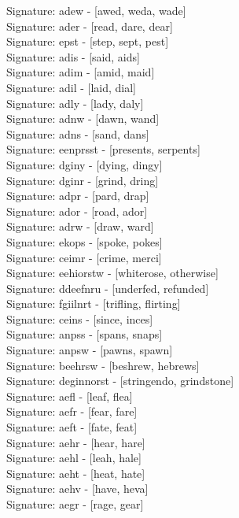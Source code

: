 Signature: {adew} - [awed, weda, wade] \\
Signature: {ader} - [read, dare, dear] \\
Signature: {epst} - [step, sept, pest] \\
Signature: {adis} - [said, aids] \\
Signature: {adim} - [amid, maid] \\
Signature: {adil} - [laid, dial] \\
Signature: {adly} - [lady, daly] \\
Signature: {adnw} - [dawn, wand] \\
Signature: {adns} - [sand, dans] \\
Signature: {eenprsst} - [presents, serpents] \\
Signature: {dginy} - [dying, dingy] \\
Signature: {dginr} - [grind, dring] \\
Signature: {adpr} - [pard, drap] \\
Signature: {ador} - [road, ador] \\
Signature: {adrw} - [draw, ward] \\
Signature: {ekops} - [spoke, pokes] \\
Signature: {ceimr} - [crime, merci] \\
Signature: {eehiorstw} - [whiterose, otherwise] \\
Signature: {ddeefnru} - [underfed, refunded] \\
Signature: {fgiilnrt} - [trifling, flirting] \\
Signature: {ceins} - [since, inces] \\
Signature: {anpss} - [spans, snaps] \\
Signature: {anpsw} - [pawns, spawn] \\
Signature: {beehrsw} - [beshrew, hebrews] \\
Signature: {deginnorst} - [stringendo, grindstone] \\
Signature: {aefl} - [leaf, flea] \\
Signature: {aefr} - [fear, fare] \\
Signature: {aeft} - [fate, feat] \\
Signature: {aehr} - [hear, hare] \\
Signature: {aehl} - [leah, hale] \\
Signature: {aeht} - [heat, hate] \\
Signature: {aehv} - [have, heva] \\
Signature: {aegr} - [rage, gear] \\
